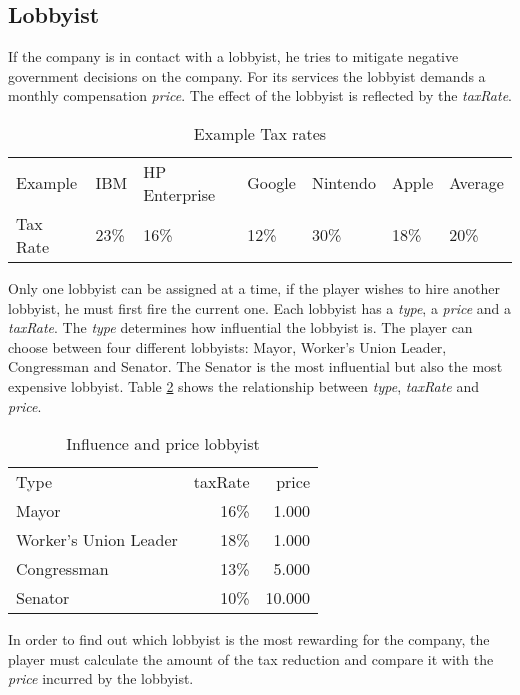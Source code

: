 \subsection{Lobbyist} \label{lobbyist_simulation}
If the company is in contact with a lobbyist, he tries to mitigate negative government decisions on the company. For its services the lobbyist demands a monthly compensation \textit{price}. The effect of the lobbyist is reflected by the \textit{taxRate}. 


\begin{table}[]
\centering
\begin{tabular}{|l|l|l|l|l|l|l|}
\hline
Example & IBM & HP Enterprise & Google & Nintendo & Apple & Average \\
Tax Rate & 23\% & 16\% & 12\% & 30\% & 18\% & 20\% \\ \hline
\end{tabular}
\caption{Example Tax rates}
\label{Example_Tax}
\end{table}

Only one lobbyist can be assigned at a time, if the player wishes to hire another lobbyist, he must first fire the current one. Each lobbyist has a \textit{type}, a \textit{price} and a \textit{taxRate}. The \textit{type} determines how influential the lobbyist is. The player can choose between four different lobbyists: Mayor, Worker’s Union Leader, Congressman and Senator. The Senator is the most influential but also the most expensive lobbyist. Table \ref{influence_lobbyist} shows the relationship between \textit{type}, \textit{taxRate} and \textit{price}. \\

\begin{table}[ht]
\centering
\begin{tabular}{|l|r|r|}
\hline
Type                    & taxRate  & price \\
Mayor                   & 16\%      & 1.000     \\
Worker's Union Leader   & 18\%      & 1.000     \\
Congressman             & 13\%      & 5.000     \\
Senator                 & 10\%      & 10.000     \\
\hline
\end{tabular}
\caption{Influence and price lobbyist}
\label{influence_lobbyist}
\end{table}

In order to find out which lobbyist is the most rewarding for the company, the player must calculate the amount of the tax reduction and compare it with the \textit{price} incurred by the lobbyist.
 



 




